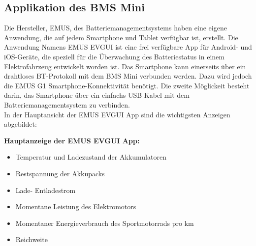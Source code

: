 \subsection{Applikation des BMS Mini}

Die Hersteller, EMUS, des Batteriemanagementsystems haben eine eigene Anwendung, die auf jedem Smartphone und Tablet verfügbar ist, erstellt. Die Anwendung Namens EMUS EVGUI ist eine frei verfügbare App für Android- und iOS-Geräte, die speziell für die Überwachung des Batteriestatus in einem Elektrofahrzeug entwickelt worden ist. Das Smartphone kann einerseits über ein drahtloses BT-Protokoll mit dem BMS Mini verbunden werden. Dazu wird jedoch die EMUS G1 Smartphone-Konnektivität benötigt. Die zweite Möglickeit besteht darin, das Smartphone über ein einfachs USB Kabel mit dem Batteriemanagementsystem zu verbinden.\\

In der Hauptansicht der EMUS EVGUI App sind die wichtigsten Anzeigen abgebildet:

\textbf{Hauptanzeige der EMUS EVGUI App:}
\begin{itemize}
\item{Temperatur und Ladezustand der Akkumulatoren}\\
\item{Restspannung der Akkupacks}\\
\item{Lade- Entladestrom}\\
\item{Momentane Leistung des Elektromotors}\\
\item{Momentaner Energieverbrauch des Sportmotorrads pro km}\\
\item{Reichweite}\\
\end{itemize}

